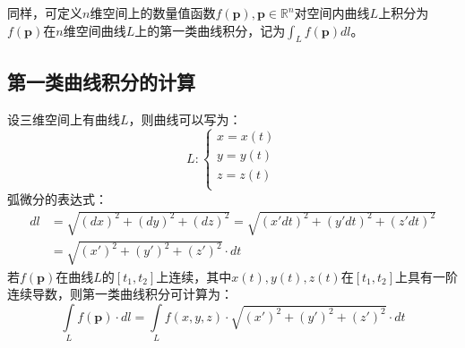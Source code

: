 同样，可定义$n$维空间上的数量值函数$f\left( \boldsymbol{p} \right) ,\boldsymbol{p}\in \mathbb{R} ^n$对空间内曲线$L$上积分为$f\left( \boldsymbol{p} \right) $在$n$维空间曲线$L$上的第一类曲线积分，记为$\int_L{f\left( \boldsymbol{p} \right) dl}$。

\subsection{第一类曲线积分的计算}

\begin{theorem}[第一类曲线积分的计算公式]
设三维空间上有曲线$L$，则曲线可以写为：
\[
L:\begin{cases}
	x=x\left( t \right)\\
	y=y\left( t \right)\\
	z=z\left( t \right)\\
\end{cases}
\]
弧微分的表达式：
\begin{align*}
dl&=\sqrt{\left( dx \right) ^2+\left( dy \right) ^2+\left( dz \right) ^2}=\sqrt{\left( x'dt \right) ^2+\left( y'dt \right) ^2+\left( z'dt \right) ^2} \\
&=\sqrt{\left( x' \right) ^2+\left( y' \right) ^2+\left( z' \right) ^2}\cdot dt
\end{align*}
若$f\left( \boldsymbol{p} \right) $在曲线$L$的$\left[ t_1,t_2 \right] $上连续，其中$x\left( t \right) ,y\left( t \right) ,z\left( t \right) $在$\left[ t_1,t_2 \right] $上具有一阶连续导数，则第一类曲线积分可计算为：
\[
\int\limits_L{f\left( \boldsymbol{p} \right) \cdot dl}=\int\limits_L{f\left( x,y,z \right) \cdot \sqrt{\left( x' \right) ^2+\left( y' \right) ^2+\left( z' \right) ^2}\cdot dt}
\]
\end{theorem}




